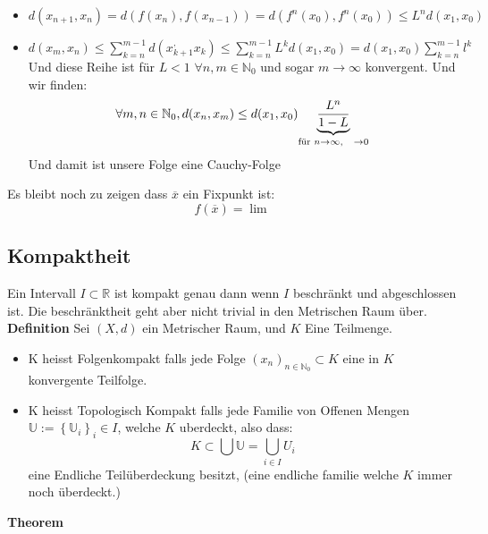 \documentclass{article}
\newcommand{\mspc}{\hspace{0.3cm}}
\begin{document}
\begin{itemize}
  \item{$d(x_{n+1},x_n)=d(f(x_n),f(x_{n-1}))=d(f^n(x_0),f^n(x_0))\le L^nd(x_1,x_0)$}
  \item{$d(x_m,x_n)\le \sum_{k=n}^{m-1}d(x_{k+1}^,x_k)\le\sum_{k=n}^{m-1}L^kd(x_1,x_0)=d(x_1,x_0)\sum_{k=n}^{m-1}l^k$ Und diese Reihe ist für $L<1$ $\forall n,m\in \mathbb{N}_0$ und sogar $m\rightarrow\infty$ konvergent.
  Und wir finden:\[\forall m,n\in\mathbb{N}_0, d(x_n,x_m)\le d(x_1,x_0)\underset{\text{für }n\rightarrow\infty,\mspc \rightarrow0}{\underbrace{\frac{L^n}{1-L}}} \]Und damit ist unsere Folge eine Cauchy-Folge }
\end{itemize}
Es bleibt noch zu zeigen dass $\overline{x}$ ein Fixpunkt ist:
\[f(\overline{x})=\lim_{}\]
\subsection{Kompaktheit} Ein Intervall $I\subset\mathbb{R}$ ist kompakt genau dann wenn $I$ beschränkt und abgeschlossen ist. Die beschränktheit geht aber nicht trivial in den Metrischen Raum über.
\newline\textbf{Definition} Sei $(X,d)$ ein Metrischer Raum, und $K$ Eine Teilmenge.\begin{itemize}
  \item{K heisst Folgenkompakt falls jede Folge $(x_n)_{n\in\mathbb{N}_0}\subset K$ eine in $K$ konvergente Teilfolge.}
\item{K heisst Topologisch Kompakt falls jede Familie von Offenen Mengen $\mathbb{U}:=\left\lbrace\mathbb{U}_i\right\rbrace_i\in I$, welche $K$ uberdeckt, also dass:\[K\subset\bigcup\mathbb{U}=\bigcup_{i\in I}U_i\] eine Endliche Teilüberdeckung besitzt, (eine endliche familie welche $K$ immer noch überdeckt.)}
\end{itemize}
\textbf{Theorem} 
\end{document}
